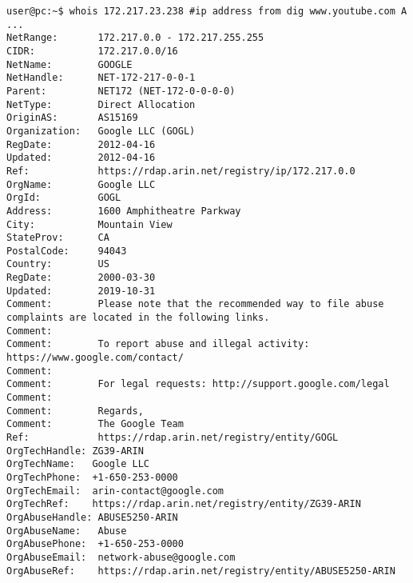 \documentclass[a4paper, 11pt]{article}
\begin{document}
\begin{lstlisting}[caption={Referenčný Whois dotaz nad doménov \textbf{www.youtube.com}.},captionpos=b, label={whois_refer_1}]
user@pc:~$ whois 172.217.23.238 #ip address from dig www.youtube.com A
...
NetRange:       172.217.0.0 - 172.217.255.255
CIDR:           172.217.0.0/16
NetName:        GOOGLE
NetHandle:      NET-172-217-0-0-1
Parent:         NET172 (NET-172-0-0-0-0)
NetType:        Direct Allocation
OriginAS:       AS15169
Organization:   Google LLC (GOGL)
RegDate:        2012-04-16
Updated:        2012-04-16
Ref:            https://rdap.arin.net/registry/ip/172.217.0.0
OrgName:        Google LLC
OrgId:          GOGL
Address:        1600 Amphitheatre Parkway
City:           Mountain View
StateProv:      CA
PostalCode:     94043
Country:        US
RegDate:        2000-03-30
Updated:        2019-10-31
Comment:        Please note that the recommended way to file abuse complaints are located in the following links. 
Comment:        
Comment:        To report abuse and illegal activity: https://www.google.com/contact/
Comment:        
Comment:        For legal requests: http://support.google.com/legal 
Comment:        
Comment:        Regards, 
Comment:        The Google Team
Ref:            https://rdap.arin.net/registry/entity/GOGL
OrgTechHandle: ZG39-ARIN
OrgTechName:   Google LLC
OrgTechPhone:  +1-650-253-0000 
OrgTechEmail:  arin-contact@google.com
OrgTechRef:    https://rdap.arin.net/registry/entity/ZG39-ARIN
OrgAbuseHandle: ABUSE5250-ARIN
OrgAbuseName:   Abuse
OrgAbusePhone:  +1-650-253-0000 
OrgAbuseEmail:  network-abuse@google.com
OrgAbuseRef:    https://rdap.arin.net/registry/entity/ABUSE5250-ARIN
\end{lstlisting}
\end{document}
